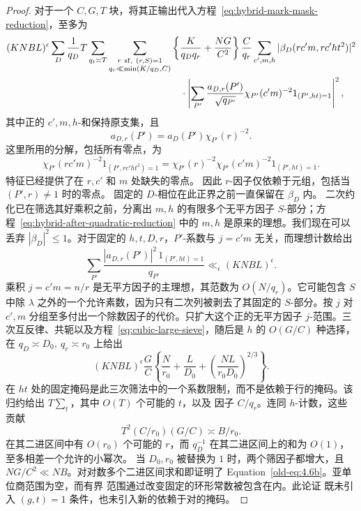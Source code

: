 \documentclass[11pt,a4paper]{article}
\numberwithin{equation}{section}
\numberwithin{figure}{section}
\theoremstyle{definition}
\theoremstyle{remark}
\begin{document}
\begin{proof}
对于一个 \(C,G,T\) 块，将其正输出代入方程~\eqref{eq:hybrid-mark-mask-reduction}，至多为
\begin{equation}\label{eq:hybrid-after-quadratic-reduction}
 \begin{split}
 (KNBL)^\epsilon\sum_D\frac1{q_D}T\sum_{q_t\asymp T}
 \sum_{\substack{r\ {\rm sf},\ (r,S)=1\\q_r\ll\min(K/q_D,C)}}
 &\left\{\frac K{q_Dq_r}+\frac{NG}{C^2}\right\}\frac C{q_r}
 \sum_{c',m,h}|\beta_D(rc'm,rc'ht^2)|^2\\
 &\quad\cdot\left|
 \sum_{P'}\frac{a_{D,r}(P')}{\sqrt{q_{P'}}}
       \chi_{P'}(c'm)^{-2}1_{(P',ht)=1}
 \right|^2,
 \end{split}
\end{equation}
其中正的 \(c',m,h\)-和保持原支集，且
\[
 a_{D,r}(P')=a_D(P')\chi_{P'}(r)^{-2}.
\]
这里所用的分解，包括所有零点，为
\[
 \chi_{P'}(rc'm)^{-2}1_{(P',rc'ht^2)=1}
 =\chi_{P'}(r)^{-2}\chi_{P'}(c'm)^{-2}1_{(P',ht)=1}.
\]
特征已经提供了在 \(r,c'\) 和 \(m\) 处缺失的零点。
因此 \(r\)-因子仅依赖于元组，包括当 \((P',r)\ne1\) 时的零点。
固定的 \(D\)-相位在此正界之前一直保留在 \(\beta_D\) 内。
二次约化已在筛选其好乘积之前，分离出 \(m,h\) 的有限多个无平方因子 \(S\)-部分；方程~\eqref{eq:hybrid-after-quadratic-reduction} 中的 \(m,h\) 是原来的理想。我们现在可以丢弃 \(|\beta_D|^2\le1\)。对于固定的 \(h,t,D,r\)，\(P'\)-系数与 \(j=c'm\) 无关，而理想计数给出
\[
 \sum_{P'}\frac{|a_{D,r}(P')|^2\,1_{(P',ht)=1}}{q_{P'}}
 \ll_\epsilon (KNBL)^\epsilon.
\]
乘积 \(j=c'm=n/r\) 是无平方因子的主理想，其范数为 \(O(N/q_r)\)。它可能包含 \(S\) 中除 \(\lambda\) 之外的一个允许素数，因为只有二次列被剥去了其固定的 \(S\)-部分。按 \(j\) 对 \(c',m\) 分组至多付出一个除数因子的代价。只扩大这个正的无平方因子 \(j\)-范围。三次互反律、共轭以及方程~\eqref{eq:cubic-large-sieve}，随后是 \(h\) 的 \(O(G/C)\) 种选择，在 \(q_D\asymp D_0,\ q_r\asymp r_0\) 上给出
\begin{equation}\label{old-eq:4.6c}
 (KNBL)^\epsilon\frac GC
 \left\{\frac N{r_0}+\frac L{D_0}
       +\left(\frac{NL}{r_0D_0}\right)^{2/3}\right\}.
\end{equation}
在 \(ht\) 处的固定掩码是此三次筛法中的一个系数限制，而不是依赖于行的掩码。该归约给出 \(T\sum_t\)，其中 \(O(T)\) 个可能的 \(t\)，以及
因子 \(C/q_r\)。连同 \(h\)-计数，这些贡献
\[
 T^2(C/r_0)(G/C)\asymp B/r_0.
\]
在其二进区间中有 \(O(r_0)\) 个可能的 \(r\)，而
\(q_D^{-1}\) 在其二进区间上的和为 \(O(1)\)，至多相差一个允许的小幂次。
当 \(D_0,r_0\) 被替换为 \(1\) 时，两个筛因子都增大，且
\(NG/C^2\ll NB\)。对对数多个二进区间求和即证明了
Equation~\eqref{old-eq:4.6b}。亚单位商范围为空，而有界
范围通过改变固定的环形常数被包含在内。此论证
既未引入 \((g,t)=1\) 条件，也未引入新的依赖于对的掩码。
\end{proof}
\end{document}
